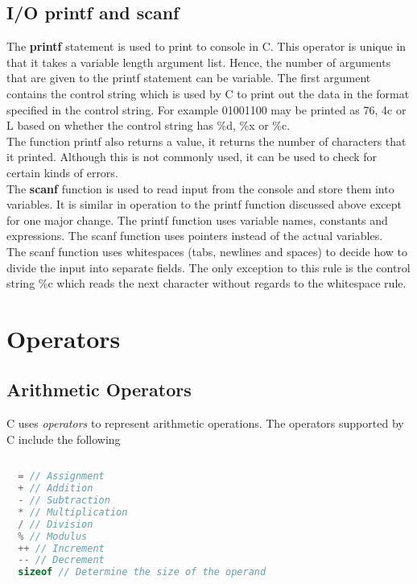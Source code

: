 \documentclass[11pt,a4paper,oneside]{book}
\begin{document}
\section{I/O printf and scanf}
The \textbf{printf} statement is used to print to console in C. This operator is unique in that it takes a
variable length argument list. Hence, the number of arguments that are given to the printf statement can be
variable. The first argument contains the control string which is used by C to print out the data in the
format specified in the control string. For example 01001100 may be printed as 76, 4c or L based on whether
the control string has \%d, \%x or \%c.\\

\noindent The function printf also returns a value, it returns the number of characters that it printed. Although
this is not commonly used, it can be used to check for certain kinds of errors.\\ 

\noindent The \textbf{scanf} function is used to read input from the console and store them into variables. It
is similar in operation to the printf function discussed above except for one major change. The printf function
uses variable names, constants and expressions. The scanf function uses pointers instead of the actual variables.\\

\noindent The scanf function uses whitespaces (tabs, newlines and spaces) to decide how to divide the input into
separate fields. The only exception to this rule is the control string \%c which reads the next character without
regards to the whitespace rule.

\chapter{Operators}
\section{Arithmetic Operators}
C uses \textit{operators} to represent arithmetic operations. The operators supported by C
include the following

\begin{lstlisting}[language=C, title=Arithmetic operators]
  
  = // Assignment
  + // Addition
  - // Subtraction
  * // Multiplication
  / // Division
  % // Modulus
  ++ // Increment
  -- // Decrement
  sizeof // Determine the size of the operand
  
\end{lstlisting}
\end{document}
